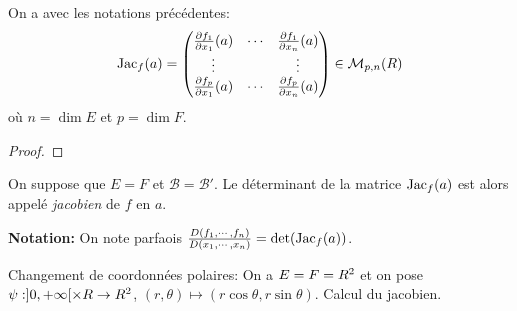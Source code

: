 \begin{proposition}
    On a avec les notations précédentes: 
    \[
        \operatorname{Jac}_f(a) =  \begin{pmatrix}
            \frac{\partial f_1}{\partial x_1}(a) & \cdots & \frac{\partial f_1}{\partial x_n}(a) \\
            \vdots & & \vdots \\
            \frac{\partial f_p}{\partial x_1}(a) & \cdots & \frac{\partial f_p}{\partial x_n}(a)\\
        \end{pmatrix} \in \mathcal M_{p,n}(R)
    \]
    où $n = \dim E$ et $p=\dim F$.
\end{proposition}

\begin{proof}
    \pl{\rep{6cm}}	
\end{proof}

\sld{\vfill\pagebreak[5]}%
\begin{definition}
    On suppose que $E=F$ et $\mathcal B = \mathcal B'$. Le déterminant de la matrice $\operatorname{Jac}_f(a)$ est alors appelé \emph{jacobien} de $f$ en $a$. 
\end{definition}

{\bf \sffamily Notation:} On note parfaois $\frac{D(f_1,\cdots,f_n)}{D(x_1,\cdots,x_n)} = \det(\operatorname{Jac}_f(a))$.
\begin{exemple}
Changement de coordonnées polaires: On a $E=F=R^2$ et on pose $\psi:]0,+\infty[ \times R \to R^2$, $(r,\theta) \mapsto (r\cos\theta,r\sin\theta)$. Calcul du jacobien.
    \pl{\rep{7cm}}
\end{exemple}
